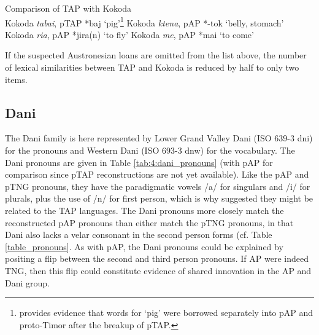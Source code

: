 \ea%
\label{ex:4:57}
\upshape 
  Comparison of TAP with Kokoda \citep{DeVries2004} \\
  \ea \upshape Kokoda \textit{ta{\textprimstress}bai}, pTAP *baj `pig'\footnote{\citet{Robinsontaalorpantar} provides evidence that words for `pig' were borrowed separately into pAP and proto-Timor after the breakup of pTAP.}
  \ex \upshape  Kokoda \textit{k{\textopeno}{\textprimstress}tena}, pAP *-tok `belly, stomach'
  \ex \upshape  Kokoda \textit{{\textprimstress}{\textbardotlessj}{\textepsilon}ria}, pAP *jira(n) `to fly'
  \ex \upshape  Kokoda \textit{m{\textopeno}e}, pAP *mai `to come' 
  \z
\z

If the suspected Austronesian loans are omitted from the list above, the number of lexical similarities between TAP and Kokoda is reduced by half to only two items.

\subsection{Dani}
The Dani family is here represented by Lower Grand Valley Dani (ISO 639-3 dni) for the pronouns and Western Dani (ISO 693-3 dnw) for the vocabulary. The Dani pronouns are given in Table \ref{tab:4:dani_pronouns} (with pAP for comparison since pTAP reconstructions are not yet available). Like the pAP and pTNG pronouns, they have the paradigmatic vowels /a/ for singulars and /i/ for plurals, plus the use of /n/ for first person, which is why \citet{Ross2005} suggested they might be related to the TAP languages. The Dani pronouns more closely match the reconstructed pAP pronouns than either match the pTNG pronouns, in that Dani also lacks a velar consonant in the second person forms (cf. Table \ref{table_pronouns}. As with pAP, the Dani pronouns could be explained by positing a flip between the second and third person pronouns. If AP were indeed TNG, then this flip could constitute evidence of shared innovation in the AP and Dani group.


